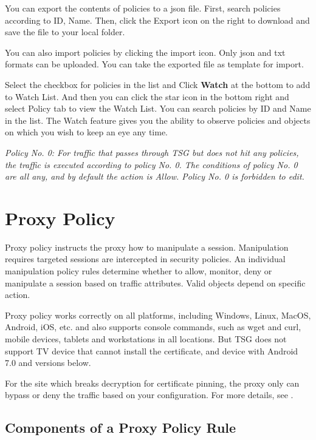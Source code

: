You can export the contents of policies to a json file. First, search policies according to ID, Name. Then, click the Export icon on the right to download and save the file to your local folder.


You can also import policies by clicking the import icon. Only json and txt formats can be uploaded. You can take the exported file as template for import.


Select the checkbox for policies in the list and Click \textbf{Watch} at the bottom to add to Watch List. And then you can click the star icon in the bottom right and select Policy tab to view the Watch List. 
You can search policies by ID and Name in the list. The Watch feature gives you the ability to observe policies and objects on which you wish to keep an eye any time. 


\notemark\textit{Policy No. 0: For traffic that passes through TSG but does not hit any policies, the traffic is executed according to policy No. 0. 
The conditions of policy No. 0 are all any, and by default the action is Allow. Policy No. 0 is forbidden to edit.}

\section*{\hypertarget{link:Proxy Policy}{Proxy Policy}}
\label{sec:policies:proxy}

Proxy policy instructs the proxy how to manipulate a session. Manipulation requires targeted sessions are intercepted in security policies. An individual manipulation policy rules determine whether to allow, monitor, deny or manipulate a session based on traffic attributes. Valid objects depend on specific action.


Proxy policy works correctly on all platforms, including Windows, Linux, MacOS, Android, iOS, etc. and also supports console commands, such as wget and curl, mobile devices, tablets and workstations in all locations. But TSG does not support TV device that cannot install the certificate, and device with Android 7.0 and versions below. 


For the site which breaks decryption for certificate pinning, the proxy only can bypass or deny the traffic based on your configuration. For more details, see \hyperlink{link:Decryption}{\color{linkblue}{Decryption}}.

\subsection*{\hypertarget{link:Components of a Proxy Policy Rule}{Components of a Proxy Policy Rule}}
\label{sec:policies:proxy:component}

